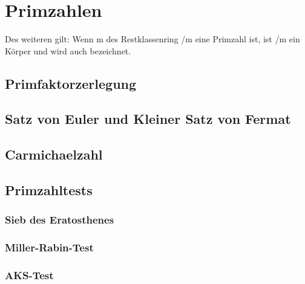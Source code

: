 \section{Primzahlen}

		Des weiteren gilt: Wenn m des Restklassenring /m eine Primzahl ist, ist /m ein Körper und wird auch  bezeichnet.

	\subsection{Primfaktorzerlegung}
	\subsection{Satz von Euler und Kleiner Satz von Fermat}
	\subsection{Carmichaelzahl}
	\subsection{Primzahltests}
		\subsubsection{Sieb des Eratosthenes}
		\subsubsection{Miller-Rabin-Test}
		\subsubsection{AKS-Test}